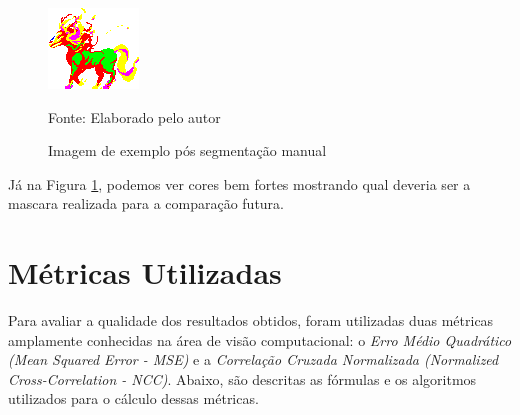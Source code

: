 \begin{figure}[ht]
    \caption{Imagem de exemplo pós segmentação manual}
    \centering
    \includegraphics[scale=2]{imagens/nightmare-idle-v2.png}

    Fonte: Elaborado pelo autor
    \label{fig:base_dados_2}
\end{figure}

Já na Figura \ref{fig:base_dados_2}, podemos ver cores bem fortes mostrando qual deveria ser a mascara realizada para a comparação futura.

\section{Métricas Utilizadas}

Para avaliar a qualidade dos resultados obtidos, foram utilizadas duas métricas amplamente conhecidas na área de visão computacional: o \textit{Erro Médio Quadrático (Mean Squared Error - MSE)} e a \textit{Correlação Cruzada Normalizada (Normalized Cross-Correlation - NCC)}. Abaixo, são descritas as fórmulas e os algoritmos utilizados para o cálculo dessas métricas.


